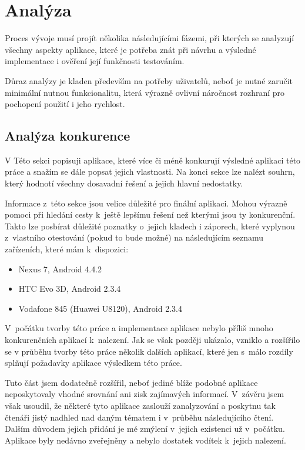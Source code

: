 \documentclass[thesis=B,czech]{FITthesis}[2013/10/20]
\begin{document}
\chapter{Analýza}

Proces vývoje musí projít několika následujícími fázemi, při kterých se analyzují všechny aspekty aplikace, které je potřeba znát při návrhu a výsledné implementace i ověření její funkčnosti testováním.

Důraz analýzy je kladen především na potřeby uživatelů, neboť je nutné zaručit minimální nutnou funkcionalitu, která výrazně ovlivní náročnost rozhraní pro pochopení použití i jeho rychlost.

\section{Analýza konkurence}

V Této sekci popisuji aplikace, které více či méně konkurují výsledné aplikaci této práce a snažím se dále popsat jejich vlastnosti. Na konci sekce lze nalézt souhrn, který hodnotí všechny dosavadní řešení a jejich hlavní nedostatky.

Informace z~této sekce jsou velice důležité pro finální aplikaci. Mohou výrazně pomoci při hledání cesty k~ještě lepšímu řešení než kterými jsou ty konkurenční. Takto lze posbírat důležité poznatky o~jejich kladech i záporech, které vyplynou z~vlastního otestování (pokud to bude možné) na následujícím seznamu zařízeních, které mám k~dispozici:
\begin{itemize}
  \item{Nexus 7, Android 4.4.2}
  \item{HTC Evo 3D, Android 2.3.4}
  \item{Vodafone 845 (Huawei U8120), Android 2.3.4}
\end{itemize}

V~počátku tvorby této práce a implementace aplikace nebylo příliš mnoho konkurenčních aplikací k~nalezení. Jak se však později ukázalo, vzniklo a rozšířilo se v průběhu tvorby této práce několik dalších aplikací, které jen s~málo rozdíly splňují požadavky aplikace výsledkem této práce.

Tuto část jsem dodatečně rozšířil, neboť jediné blíže podobné aplikace neposkytovaly vhodné srovnání ani zisk zajímavých informací. V~závěru jsem však usoudil, že některé tyto aplikace zaslouží zanalyzování a poskytnu tak čtenáři jistý nadhled nad daným tématem i v~průběhu následujícího čtení. Dalším důvodem jejich přidání je mé zmýlení v~jejich existenci už v~počátku. Aplikace byly nedávno zveřejněny a nebylo dostatek vodítek k~jejich nalezení.
\end{document}
